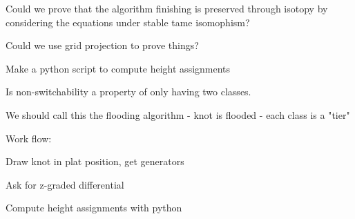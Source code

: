 \documentclass[11pt]{amsart}
\begin{document}
Could we prove that the algorithm finishing is preserved through isotopy by considering the equations under stable tame isomophism?

Could we use grid projection to prove things?

Make a python script to compute height assignments


Is non-switchability a property of only having two classes.


We should call this the flooding algorithm - knot is flooded  - each class is a "tier" 


Work flow:



Draw knot in plat position, get generators

Ask for z-graded differential

Compute height assignments with python
\end{document}

